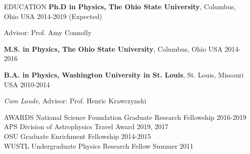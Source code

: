\documentclass{resume} %
\newenvironment{list1}{
  \begin{list}{\ding{113}}{%
      \setlength{\itemsep}{0in}
      \setlength{\parsep}{0in} \setlength{\parskip}{0in}
      \setlength{\topsep}{0in} \setlength{\partopsep}{0in} 
      \setlength{\leftmargin}{0.17in}}}{\end{list}}
\begin{document}

\begin{rSection}{EDUCATION}
\textbf{Ph.D in Physics, The Ohio State University}, Columbus, Ohio USA \hfill 2014-2019 (Expected)\\
\vspace*{-.15in}
\begin{list1}
\item[]Advisor: Prof. Amy Connolly
\end{list1}

\textbf{M.S. in Physics, The Ohio State University}, Columbus, Ohio USA \hfill 2014-2016

\textbf{B.A. in Physics, Washington University in St. Louis}, St. Louis, Missouri USA \hfill 2010-2014\\
\vspace*{-.15in}
\begin{list1}
\item[] \textit{Cum Laude}, Advisor: Prof. Henric Krawczynski
\end{list1}
\end{rSection}


\begin{rSection}{AWARDS}
National Science Foundation Graduate Research Fellowship \hfill 2016-2019 \\
APS Division of Astrophysics Travel Award \hfill 2019, 2017 \\
OSU Graduate Enrichment Fellowship \hfill 2014-2015 \\
WUSTL Undergraduate Physics Research Fellow \hfill Summer 2011 
\end{rSection}

\end{document}
